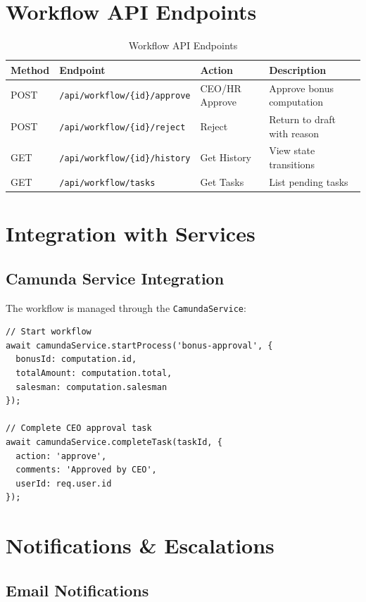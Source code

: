 \documentclass[11pt,a4paper,oneside,openany]{book}
\newcommand{\code}[1]{\texttt{\small #1}}
\begin{document}
\section{Workflow API Endpoints}

\begin{table}[H]
\centering
\small
\begin{tabular}{|l|l|l|p{3cm}|}
\hline
\textbf{Method} & \textbf{Endpoint} & \textbf{Action} & \textbf{Description} \\
\hline
POST & \texttt{/api/workflow/\{id\}/approve} & CEO/HR Approve & Approve bonus computation \\
POST & \texttt{/api/workflow/\{id\}/reject} & Reject & Return to draft with reason \\
GET & \texttt{/api/workflow/\{id\}/history} & Get History & View state transitions \\
GET & \texttt{/api/workflow/tasks} & Get Tasks & List pending tasks \\
\hline
\end{tabular}
\caption{Workflow API Endpoints}
\end{table}

\section{Integration with Services}

\subsection{Camunda Service Integration}

The workflow is managed through the \code{CamundaService}:

\begin{lstlisting}[caption=Camunda Service Integration Example]
// Start workflow
await camundaService.startProcess('bonus-approval', {
  bonusId: computation.id,
  totalAmount: computation.total,
  salesman: computation.salesman
});

// Complete CEO approval task
await camundaService.completeTask(taskId, {
  action: 'approve',
  comments: 'Approved by CEO',
  userId: req.user.id
});
\end{lstlisting}

\section{Notifications \& Escalations}

\subsection{Email Notifications}
\end{document}
